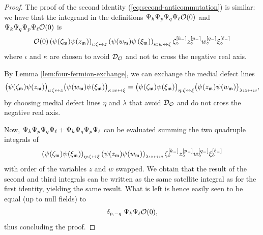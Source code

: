 \documentclass[12pt,oneside,english]{amsart}
\numberwithin{equation}{section}
\numberwithin{figure}{section}
\theoremstyle{plain}
\theoremstyle{plain}
\theoremstyle{plain}
\theoremstyle{plain}
\theoremstyle{remark}
\theoremstyle{definition}
\theoremstyle{plain}
\theoremstyle{plain}
\numberwithin{thm}{section}
\begin{document}
\begin{proof}
The proof of the second identity (\ref{eq:second-anticommutation})
is similar: we have that the integrand in the definitions 
${\Psi}_{k}{\Psi}_{p}{\Psi}_{q}{\Psi}_{\ell}{\mathcal{O}}(0) $
and ${\Psi}_{k}{\Psi}_{q}{\Psi}_{p}{\Psi}_{\ell}{\mathcal{O}}(0) $
is 
\[
{\mathcal{O}}(0) 
  \left({\psi}(\zeta_{\mathfrak{m}})  {\psi}(z_{\mathfrak{m}}) \right)_{
    \iota:\zeta\leftrightarrow z}
\left( {\psi}(w_{\mathfrak{m}})  {\psi}\left(\xi_{\mathfrak{m}}\right)
    \right)_{\kappa:w\leftrightarrow\xi}  
  {\zeta_{\diamond}^{[{k_{-}}]}}
  {z_{\diamond}^{[{p_{-}}]}}
  {w_{\diamond}^{[{q_{-}}]}}
  {\xi_{\diamond}^{[{\ell_{-}}]}}
\]
where $\iota$ and $\kappa$ are chosen to avoid ${\mathcal{D}}_{{\mathcal{O}}}$
and not to cross the negative real axis.

By Lemma \ref{lem:four-fermion-exchange}, we can exchange the medial
defect lines 
\[
\big( {\psi}(\zeta_{\mathfrak{m}})  {\psi}(z_{\mathfrak{m}}) 
    \big)_{\iota:\zeta\leftrightarrow z}  
  \big({\psi}(w_{\mathfrak{m}})  {\psi}(\xi_{\mathfrak{m}})
    \big)_{\kappa:w\leftrightarrow\xi} 
= \big( {\psi}(\zeta_{\mathfrak{m}})  {\psi}(\xi_{\mathfrak{m}})
    \big)_{ \eta:\zeta\leftrightarrow\xi} 
  \big( {\psi}(z_{\mathfrak{m}}) {\psi}(w_{\mathfrak{m}}) 
    \big)_{\lambda:z\leftrightarrow w},
\]
by choosing medial defect lines $\eta$ and $\lambda$ that avoid
${\mathcal{D}}_{{\mathcal{O}}}$ and do not cross the negative real
axis.

Now,
${\Psi}_{k} {\Psi}_{p} {\Psi}_{q} {\Psi}_{\ell}
+ {\Psi}_{k} {\Psi}_{q} {\Psi}_{p} {\Psi}_{\ell}$
can be evaluated summing the two quadruple integrals of 
\[
\left({\psi}(\zeta_{\mathfrak{m}})  {\psi}(\xi_{\mathfrak{m}})
    \right)_{\eta:\zeta\leftrightarrow\xi}
  \left({\psi}(z_{\mathfrak{m}}) {\psi}(w_{\mathfrak{m}}) 
    \right)_{\lambda:z\leftrightarrow w}
  {\zeta_{\diamond}^{[{k_{-}}]}}
  {z_{\diamond}^{[{p_{-}}]}}
  {w_{\diamond}^{[{q_{-}}]}}
  {\xi_{\diamond}^{[{\ell_{-}}]}}
\]
with order of the variables $z$ and $w$ swapped. We obtain that
the result of the second and third integrals can be written as the
same satellite integral as for the first identity, yielding the same
result. What is left is hence easily seen to be equal (up to null fields) to 
\[
\delta_{p,-q} \; {\Psi}_{k}{\Psi}_{\ell}{\mathcal{O}}(0) ,
\]
thus concluding the proof.
\end{proof}
\end{document}
